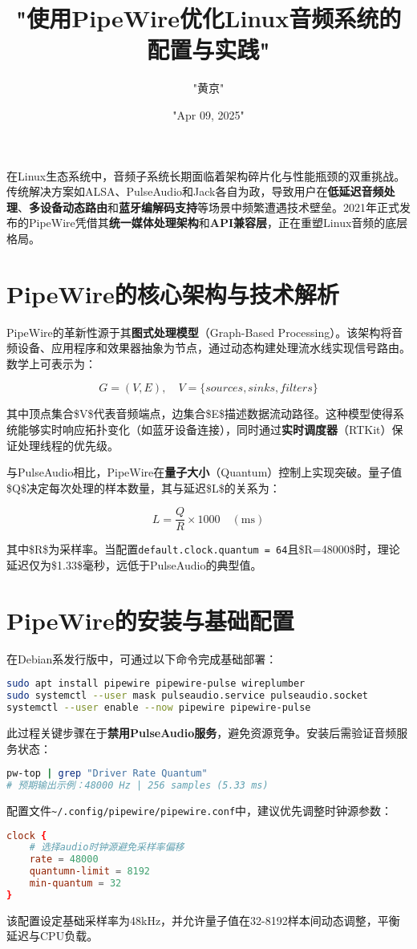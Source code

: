 \title{"使用PipeWire优化Linux音频系统的配置与实践"}
\author{"黄京"}
\date{"Apr 09, 2025"}
\maketitle
在Linux生态系统中，音频子系统长期面临着架构碎片化与性能瓶颈的双重挑战。传统解决方案如ALSA、PulseAudio和Jack各自为政，导致用户在\textbf{低延迟音频处理}、\textbf{多设备动态路由}和\textbf{蓝牙编解码支持}等场景中频繁遭遇技术壁垒。2021年正式发布的PipeWire凭借其\textbf{统一媒体处理架构}和\textbf{API兼容层}，正在重塑Linux音频的底层格局。\par
\chapter{PipeWire的核心架构与技术解析}
PipeWire的革新性源于其\textbf{图式处理模型}（Graph-Based Processing）。该架构将音频设备、应用程序和效果器抽象为节点，通过动态构建处理流水线实现信号路由。数学上可表示为：\par
$$ G = (V, E),\quad V = \{sources, sinks, filters\} $$\par
其中顶点集合\${}V\${}代表音频端点，边集合\${}E\${}描述数据流动路径。这种模型使得系统能够实时响应拓扑变化（如蓝牙设备连接），同时通过\textbf{实时调度器}（RTKit）保证处理线程的优先级。\par
与PulseAudio相比，PipeWire在\textbf{量子大小}（Quantum）控制上实现突破。量子值\${}Q\${}决定每次处理的样本数量，其与延迟\${}L\${}的关系为：\par
$$ L = \frac{Q}{R} \times 1000\quad (\text{ms}) $$\par
其中\${}R\${}为采样率。当配置\verb!default.clock.quantum = 64!且\${}R=48000\${}时，理论延迟仅为\${}1.33\${}毫秒，远低于PulseAudio的典型值。\par
\chapter{PipeWire的安装与基础配置}
在Debian系发行版中，可通过以下命令完成基础部署：\par
\begin{lstlisting}[language=bash]
sudo apt install pipewire pipewire-pulse wireplumber
sudo systemctl --user mask pulseaudio.service pulseaudio.socket
systemctl --user enable --now pipewire pipewire-pulse
\end{lstlisting}
此过程关键步骤在于\textbf{禁用PulseAudio服务}，避免资源竞争。安装后需验证音频服务状态：\par
\begin{lstlisting}[language=bash]
pw-top | grep "Driver Rate Quantum"
# 预期输出示例：48000 Hz | 256 samples (5.33 ms)
\end{lstlisting}
配置文件\verb!~/.config/pipewire/pipewire.conf!中，建议优先调整时钟源参数：\par
\begin{lstlisting}[language=conf]
clock {
    # 选择audio时钟源避免采样率偏移
    rate = 48000
    quantumn-limit = 8192
    min-quantum = 32
}
\end{lstlisting}
该配置设定基础采样率为48kHz，并允许量子值在32-8192样本间动态调整，平衡延迟与CPU负载。\par
